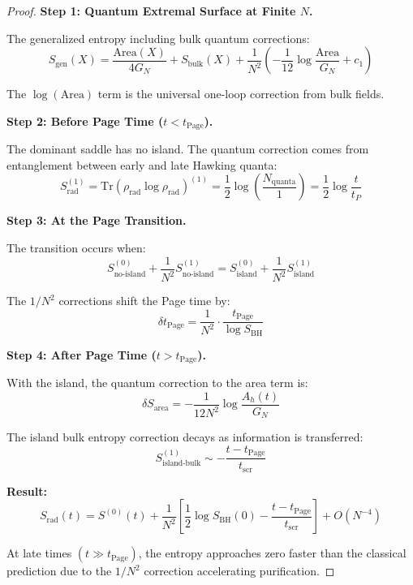 \documentclass[12pt,a4paper]{article}
\begin{document}
\begin{proof}
\textbf{Step 1: Quantum Extremal Surface at Finite $N$.}

The generalized entropy including bulk quantum corrections:
\begin{equation}
S_{\text{gen}}(X) = \frac{\text{Area}(X)}{4G_N} + S_{\text{bulk}}(X) + \frac{1}{N^2}\left( -\frac{1}{12}\log\frac{\text{Area}}{G_N} + c_1 \right)
\end{equation}

The $\log(\text{Area})$ term is the universal one-loop correction from bulk fields.

\textbf{Step 2: Before Page Time ($t < t_{\text{Page}}$).}

The dominant saddle has no island. The quantum correction comes from entanglement between early and late Hawking quanta:
\begin{equation}
S_{\text{rad}}^{(1)} = \text{Tr}(\rho_{\text{rad}} \log \rho_{\text{rad}})^{(1)} = \frac{1}{2}\log\left(\frac{N_{\text{quanta}}}{1}\right) = \frac{1}{2}\log\frac{t}{t_P}
\end{equation}

\textbf{Step 3: At the Page Transition.}

The transition occurs when:
\begin{equation}
S_{\text{no-island}}^{(0)} + \frac{1}{N^2}S_{\text{no-island}}^{(1)} = S_{\text{island}}^{(0)} + \frac{1}{N^2}S_{\text{island}}^{(1)}
\end{equation}

The $1/N^2$ corrections shift the Page time by:
\begin{equation}
\delta t_{\text{Page}} = \frac{1}{N^2} \cdot \frac{t_{\text{Page}}}{\log S_{\text{BH}}}
\end{equation}

\textbf{Step 4: After Page Time ($t > t_{\text{Page}}$).}

With the island, the quantum correction to the area term is:
\begin{equation}
\delta S_{\text{area}} = -\frac{1}{12N^2}\log\frac{A_h(t)}{G_N}
\end{equation}

The island bulk entropy correction decays as information is transferred:
\begin{equation}
S_{\text{island-bulk}}^{(1)} \sim -\frac{t - t_{\text{Page}}}{t_{\text{scr}}}
\end{equation}

\textbf{Result:}
\begin{equation}
S_{\text{rad}}(t) = S^{(0)}(t) + \frac{1}{N^2}\left[ \frac{1}{2}\log S_{\text{BH}}(0) - \frac{t - t_{\text{Page}}}{t_{\text{scr}}} \right] + O(N^{-4})
\end{equation}

At late times $(t \gg t_{\text{Page}})$, the entropy approaches zero faster than the classical prediction due to the $1/N^2$ correction accelerating purification.
\end{proof}
\end{document}
